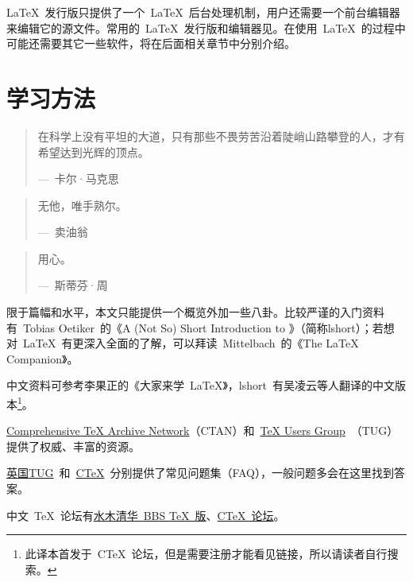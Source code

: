 \LaTeX~发行版只提供了一个~\LaTeX~后台处理机制，用户还需要一个前台编辑器来编辑它的源文件。常用的~\LaTeX~发行版和编辑器见。在使用~\LaTeX~的过程中可能还需要其它一些软件，将在后面相关章节中分别介绍。

\section{学习方法}
\begin{quotation}
在科学上没有平坦的大道，只有那些不畏劳苦沿着陡峭山路攀登的人，才有希望达到光辉的顶点。
\begin{flushright}
---~卡尔·马克思
\end{flushright}
\end{quotation}

\begin{quotation}
无他，唯手熟尔。
\begin{flushright}
---~卖油翁
\end{flushright}
\end{quotation}

\begin{quotation}
用心。
\begin{flushright}
---~斯蒂芬·周
\end{flushright}
\end{quotation}

限于篇幅和水平，本文只能提供一个概览外加一些八卦。比较严谨的入门资料有~Tobias Oetiker~的《A (Not So) Short Introduction to \LaTeXe》\citep{Oetiker_2008}（简称lshort）；若想对~\LaTeX~有更深入全面的了解，可以拜读~Mittelbach~的《The \LaTeX~ Companion》\citep{Mittelbach_2004}。

中文资料可参考李果正的《大家来学~\LaTeX》\citep{Lee_2004}，lshort~有吴凌云等人翻译的中文版本\footnote{此译本首发于~CTeX~论坛，但是需要注册才能看见链接，所以请读者自行搜索。}。

\href{http://www.ctan.org/}{Comprehensive TeX Archive Network}（CTAN）和~\href{http://www.tug.org/}{TeX Users Group}~（TUG）提供了权威、丰富的资源。

\href{http://www.text.ac.uk/}{英国TUG}~和~\href{http://www.ctex.org}{CTeX}~分别提供了常见问题集（FAQ）\citep{UKTUG_FAQ,CTeX_FAQ}，一般问题多会在这里找到答案。

中文~\TeX~论坛有\href{http://www.smth.org/bbsdoc.php?board=TeX}{水木清华~BBS TeX~版}、\href{http://bbs.ctex.org/}{CTeX~论坛}。



\newpage

